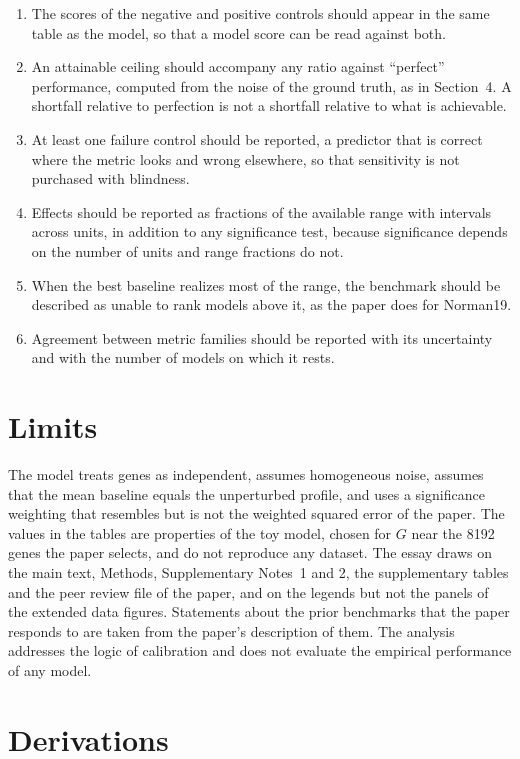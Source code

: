 \documentclass[11pt]{article}
\theoremstyle{definition}
\begin{document}
\begin{enumerate}
\item The scores of the negative and positive controls should appear in the same table as the model, so that a model score can be read against both.
\item An attainable ceiling should accompany any ratio against ``perfect'' performance, computed from the noise of the ground truth, as in Section~4. A shortfall relative to perfection is not a shortfall relative to what is achievable.
\item At least one failure control should be reported, a predictor that is correct where the metric looks and wrong elsewhere, so that sensitivity is not purchased with blindness.
\item Effects should be reported as fractions of the available range with intervals across units, in addition to any significance test, because significance depends on the number of units and range fractions do not.
\item When the best baseline realizes most of the range, the benchmark should be described as unable to rank models above it, as the paper does for Norman19.
\item Agreement between metric families should be reported with its uncertainty and with the number of models on which it rests.
\end{enumerate}

\section{Limits}

The model treats genes as independent, assumes homogeneous noise, assumes that the mean baseline equals the unperturbed profile, and uses a significance weighting that resembles but is not the weighted squared error of the paper. The values in the tables are properties of the toy model, chosen for $G$ near the 8192 genes the paper selects, and do not reproduce any dataset. The essay draws on the main text, Methods, Supplementary Notes~1 and 2, the supplementary tables and the peer review file of the paper, and on the legends but not the panels of the extended data figures. Statements about the prior benchmarks that the paper responds to are taken from the paper's description of them. The analysis addresses the logic of calibration and does not evaluate the empirical performance of any model.

\appendix
\section{Derivations}
\end{document}
